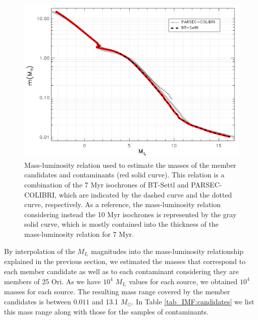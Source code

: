 \documentclass[12pt]{article}
\newcounter{subsubsubsection}[subsubsection]
\begin{document}
\begin{figure}[ht!]
	\begin{minipage}{0.60\textwidth}
		\includegraphics[width=1.00\textwidth]{f_7.pdf}
	\end{minipage} \hfill
	\begin{minipage}{0.38\textwidth}
		\caption[Mass-luminosity relation for estimating masses.]{Mass-luminosity relation used to estimate the masses of the member candidates and contaminants (red solid curve). This relation is a combination of the 7 Myr isochrones of BT-Settl and PARSEC-COLIBRI, which are indicated by the dashed curve and the dotted curve, respectively. As a reference, the mass-luminosity relation considering instead the 10 Myr isochrones is represented by the gray solid curve, which is mostly contained into the thickness of the mass-luminosity relation for 7 Myr.}
		\label{fig_IMF:mass-L}
	\end{minipage}
\end{figure}

\label{sec_IMF:sys-imf}
By interpolation of the $M_{I_c}$ magnitudes into the mass-luminosity relationship explained in the previous section, we estimated the masses that correspond to each member candidate as well as to each contaminant considering they are members of 25 Ori. As we have $10^4$ $M_{I_c}$ values for each source, we obtained $10^4$ masses for each source. The resulting mass range covered by the member candidates is between $0.011$ and 13.1 $M_\odot$. In Table \ref{tab_IMF:candidates} we list this mass range along with those for the samples of contaminants.
\end{document}
